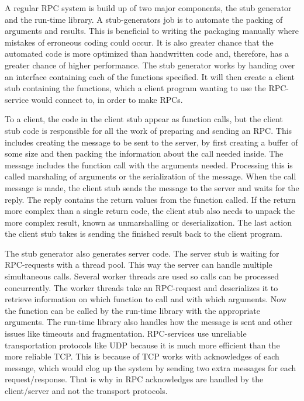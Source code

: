 \documentclass[11pt]{article}
\begin{document}
A regular RPC system is build up of two major components, the stub generator and the run-time library\cite{rpc}. A stub-generators job is to automate the packing of arguments and results. This is beneficial to writing the packaging manually where mistakes of erroneous coding could occur. It is also greater chance that the automated code is more optimized than handwritten code and, therefore, has a greater chance of higher performance. The stub generator works by handing over an interface containing each of the functions specified. It will then create a client stub containing the functions, which a client program wanting to use the RPC-service would connect to, in order to make RPCs. 

To a client, the code in the client stub appear as function calls, but the client stub code is responsible for all the work of preparing and sending an RPC. This includes creating the message to be sent to the server, by first creating a buffer of some size and then packing the information about the call needed inside. The message includes the function call with the arguments needed. Processing this is called marshaling of arguments or the serialization of the message. When the call message is made, the client stub sends the message to the server and waits for the reply. The reply contains the return values from the function called. If the return more complex than a single return code, the client stub also needs to unpack the more complex result, known as unmarshalling or deserialization. The last action the client stub takes is sending the finished result back to the client program. 

The stub generator also generates server code. The server stub is waiting for RPC-requests with a thread pool. This way the server can handle multiple simultaneous calls. Several worker threads are used so calls can be processed concurrently. The worker threads take an RPC-request and deserializes it to retrieve information on which function to call and with which arguments. Now the function can be called by the run-time library with the appropriate arguments. The run-time library also handles how the message is sent and other issues like timeouts and fragmentation. RPC-services use unreliable transportation protocols like UDP because it is much more efficient than the more reliable TCP. This is because of TCP works with acknowledges of each message, which would clog up the system by sending two extra messages for each request/response. That is why in RPC acknowledges are handled by the client/server and not the transport protocols. 
\end{document}
